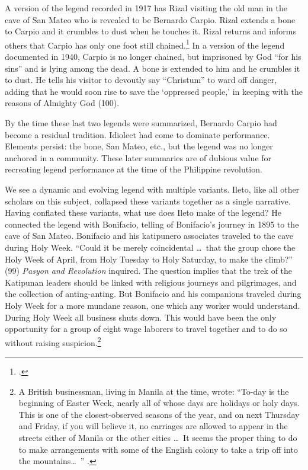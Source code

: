 A version of the legend recorded in 1917 has Rizal visiting the old man in the cave of San Mateo who is revealed to be Bernardo Carpio. Rizal extends a bone to Carpio and it crumbles to dust when he touches it. Rizal returns and informs others that Carpio has only one foot still chained.\footcite[41]{Ileto1982} In a version of the legend documented in 1940, Carpio is no longer chained, but imprisoned by God \enquote{for his sins} and is lying among the dead. A bone is extended to him and he crumbles it to dust. He tells his visitor to devoutly say \enquote{Christum} to ward off danger, adding that he would soon rise to save the \enquote*{oppressed people,} in keeping with the reasons of Almighty God (100).

By the time these last two legends were summarized, Bernardo Carpio had become a residual tradition. Idiolect had come to dominate performance. Elements persist: the bone, San Mateo, etc., but the legend was no longer anchored in a community. These later summaries are of dubious value for recreating legend performance at the time of the Philippine revolution. 

We see a dynamic and evolving legend with multiple variants. Ileto, like all other scholars on this subject, collapsed these variants together as a single narrative. Having conflated these variants, what use does Ileto make of the legend? He connected the legend with Bonifacio, telling of Bonifacio's journey in 1895 to the cave of San Mateo. Bonifacio and his katipunero associates traveled to the cave during Holy Week. \enquote{Could it be merely coincidental \ldots\ that the group chose the Holy Week of April, from Holy Tuesday to Holy Saturday, to make the climb?} (99) \textit{Pasyon and Revolution} inquired. The question implies that the trek of the Katipunan leaders should be linked with religious journeys and pilgrimages, and the collection of anting-anting. But Bonifacio and his companions traveled during Holy Week for a more mundane reason, one which any worker would understand. During Holy Week all business shuts down. This would have been the only opportunity for a group of eight wage laborers to travel together and to do so without raising suspicion.\footnote{A British businessman, living in Manila at the time, wrote: \enquote{To-day is the beginning of Easter Week, nearly all of whose days are holidays or holy days. This is one of the closest-observed seasons of the year, and on next Thursday and Friday, if you will believe it, no carriages are allowed to appear in the streets either of Manila or the other cities \ldots\ It seems the proper thing to do to make arrangements with some of the English colony  to take a trip off into the mountains\ldots\ } \parencite[58-9]{Stevens1898}.}

